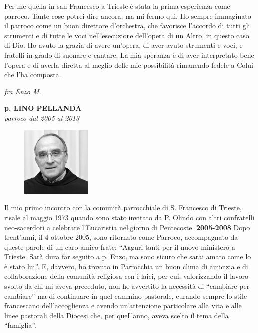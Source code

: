 Per me quella in san Francesco a Trieste è stata la prima esperienza come parroco. Tante cose 
potrei dire ancora, ma mi fermo qui. Ho sempre immaginato il parroco come un buon direttore 
d’orchestra, che favorisce l’accordo di tutti gli strumenti e di tutte le voci nell’esecuzione 
dell’opera di un Altro, in questo caso di Dio. Ho avuto la grazia di avere un’opera, di aver avuto 
strumenti e voci, e fratelli in grado di suonare e cantare. La mia speranza è di aver interpretato 
bene l’opera e di averla diretta al meglio delle mie possibilità rimanendo fedele a Colui che l’ha 
composta.
\begin{flushright}
\textit{fra Enzo M.}
\end{flushright}
\endgroup
\newpage
\begin{center}
\textbf{\Large p. LINO PELLANDA}\\
	\textit{parroco dal 2005 al 2013}
\end{center}
\bigbreak
\begingroup
\setlength\intextsep{0pt}
\begin{figure}
\centering
\includegraphics[width=0.30\textwidth]{immagini/lino.jpg}
\end{figure}
\noindent Il mio primo incontro con la comunità parrocchiale di S. Francesco di Trieste, risale al 
maggio 1973 quando sono stato invitato da P. Olindo con altri confratelli neo-sacerdoti a celebrare 
l'Eucaristia nel giorno di Pentecoste.
\bigbreak
\noindent \textbf{2005-2008}
\medbreak
\noindent Dopo trent'anni, il 4 ottobre 2005, sono ritornato come Parroco, accompagnato da queste 
parole di un caro amico frate: ``Auguri tanti per il nuovo ministero a Trieste. Sarà dura far seguito a 
p. Enzo, ma sono sicuro che sarai amato come lo è stato lui''.
E, davvero, ho trovato in Parrocchia un buon clima di amicizia e di collaborazione della comunità 
religiosa con i laici, per cui, valorizzando il lavoro svolto da chi mi aveva preceduto, non ho 
avvertito la necessità di “cambiare per cambiare” ma di continuare in quel cammino pastorale, 
curando sempre lo stile francescano dell'accoglienza e avendo un'attenzione particolare alla vita e 
alle linee pastorali della Diocesi che, per quell'anno, aveva scelto il tema della “famiglia”.
